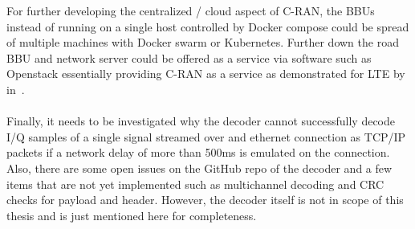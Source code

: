 For further developing the centralized / cloud aspect of C-RAN, the BBUs instead of running on a single host
controlled by Docker compose could be spread of multiple machines with Docker swarm or Kubernetes. 
Further down the road BBU and network server could be offered as a service via software such as Openstack 
essentially providing C-RAN as a service as demonstrated for LTE by in~\cite{Nikaein2015}.
\\ \\
Finally, it needs to be investigated why the decoder cannot successfully decode I/Q samples of a single signal streamed over and ethernet connection as TCP/IP packets 
if a network delay of more than 500ms is emulated on the connection. Also, there are some open issues on the 
GitHub repo of the decoder and a few items that are not yet implemented such as multichannel decoding and 
CRC checks for payload and header. However, the decoder itself is not in scope of this thesis and is just mentioned here for 
completeness.


